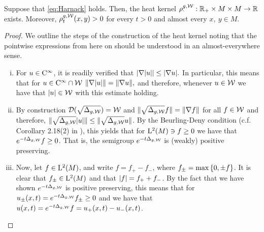 \documentclass[a4paper, 12pt]{amsart}
\begin{document}
\begin{prop}
\label{prop:MainRed}
Suppose that \eqref{eq:Harnack} holds. Then, the heat
kernel $\rho^{g,\mathcal{W}}_{\cdotp}: \mathbb{R}_{+} \times M \times M \to \mathbb{R}$
exists. Moreover, $\rho^{g,\mathcal{W}}_t(x,y) > 0$ for
every $t > 0$ and almost every $x,\ y \in M$. 
\end{prop} 
\begin{proof}
We outline the steps of the construction of the heat kernel
noting that the pointwise expressions from here on should be
understood in an almost-everywhere sense.
\begin{enumerate}[(i)]
\item For $u \in {\rm C}^{\infty}_{\rm {}}$, it is readily verified that 
	$| \nabla |u|| \leq | \nabla u|.$
	In particular, this means that 
	for $u \in {\rm C}^{\infty}_{\rm {}} \cap \mathcal{W}$
	$\| \nabla |u| \| = \| \nabla u \|,$
	and therefore, whenever $u \in \mathcal{W}$
	we have that $|u| \in \mathcal{W}$ 
	with this estimate holding.

\item 	By construction ${\mathcal{D}}(\sqrt{\Delta_{g, \mathcal{W}}}) = \mathcal{W}$
	and $\| \sqrt{\Delta_{g,\mathcal{W}}} f \| = \| \nabla f \|$
	for all $f \in \mathcal{W}$ and therefore, 
	$\| \sqrt{\Delta_{g, \mathcal{W}}} |u| \| 
		\leq \| \sqrt{\Delta_{g, \mathcal{W}}} u \|$. 
	By the Beurling-Deny condition (c.f.  Corollary 2.18(2) in  \cite{El-Maati}), 
	this yields that for ${\rm L}^{2}_{\rm {}}(M) \ni f \geq 0$
	we have that  $e^{-t \Delta_{g,\mathcal{W}}} f \geq 0$. That is, the semigroup 
	$e^{-t \Delta_{g,\mathcal{W}}}$ is (weakly) positive preserving.

\item Now, let $f \in {\rm L}^{2}_{\rm {}}(M)$, and write
	$f = f_+ - f_-$, where $f_{\pm} = \max\left\{0,\pm f\right\}$.
	It is clear that $f_{\pm} \in {\rm L}^{2}_{\rm {}}(M)$
	and that $|f| = f_+ + f_-$.
	By the fact that we have shown $e^{-t\Delta_{g,\mathcal{W}}}$ 
	is positive preserving, this means that
	for $u_{\pm} (x,t) = e^{-t\Delta_{g,\mathcal{W}}} f_{\pm} \geq 0$	
	and we have that $u(x,t) = e^{-t \Delta_{g,\mathcal{W}}} f = u_+(x,t) - u_-(x,t)$.


\end{enumerate}
\end{proof}
\end{document}
